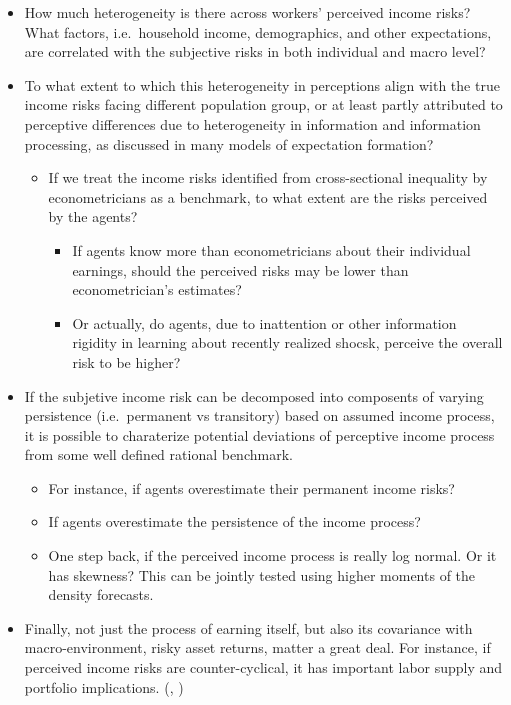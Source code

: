 \documentclass[12pt,notitlepage,onecolumn,aps,pra]{article}
\providecommand{\tightlist}{%
      \setlength{\itemsep}{0pt}\setlength{\parskip}{0pt}}
\begin{document}
\begin{itemize}
\item
  How much heterogeneity is there across workers' perceived income
  risks? What factors, i.e.~household income, demographics, and other
  expectations, are correlated with the subjective risks in both
  individual and macro level?
\item
  To what extent to which this heterogeneity in perceptions align with
  the true income risks facing different population group, or at least
  partly attributed to perceptive differences due to heterogeneity in
  information and information processing, as discussed in many models of
  expectation formation?

  \begin{itemize}
  \tightlist
  \item
    If we treat the income risks identified from cross-sectional
    inequality by econometricians as a benchmark, to what extent are the
    risks perceived by the agents?

    \begin{itemize}
    \tightlist
    \item
      If agents know more than econometricians about their individual
      earnings, should the perceived risks may be lower than
      econometrician's estimates?
    \item
      Or actually, do agents, due to inattention or other information
      rigidity in learning about recently realized shocsk, perceive the
      overall risk to be higher?
    \end{itemize}
  \end{itemize}
\item
  If the subjetive income risk can be decomposed into composents of
  varying persistence (i.e.~permanent vs transitory) based on assumed
  income process, it is possible to charaterize potential deviations of
  perceptive income process from some well defined rational benchmark.

  \begin{itemize}
  \tightlist
  \item
    For instance, if agents overestimate their permanent income risks?
  \item
    If agents overestimate the persistence of the income process?
    \cite{rozsypal_overpersistence_2017}
  \item
    One step back, if the perceived income process is really log normal.
    Or it has skewness? This can be jointly tested using higher moments
    of the density forecasts.
  \end{itemize}
\item
  Finally, not just the process of earning itself, but also its
  covariance with macro-environment, risky asset returns, matter a great
  deal. For instance, if perceived income risks are counter-cyclical, it
  has important labor supply and portfolio implications.
  (\cite{guvenen2014nature}, \cite{catherine_countercyclical_2019})
\end{itemize}
\end{document}
